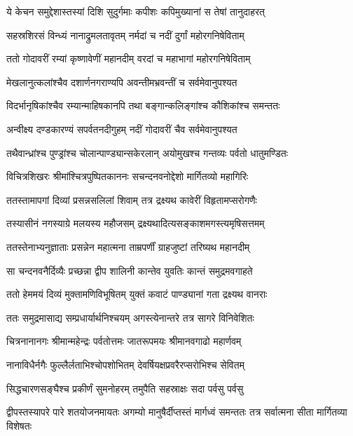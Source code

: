 \twolineshloka
{ये केचन समुद्देशास्तस्यां दिशि सुदुर्गमाः}
{कपीशः कपिमुख्यानां स तेषां तानुदाहरत्} %

\twolineshloka
{सहस्रशिरसं विन्ध्यं नानाद्रुमलतावृतम्}
{नर्मदां च नदीं दुर्गां महोरगनिषेविताम्} %

\twolineshloka
{ततो गोदावरीं रम्यां कृष्णावेणीं महानदीम्}
{वरदां च महाभागां महोरगनिषेविताम्} %

\twolineshloka
{मेखलानुत्कलांश्चैव दशार्णनगराण्यपि}
{अवन्तीमभ्रवन्तीं च सर्वमेवानुपश्यत} %

\twolineshloka
{विदर्भानृषिकांश्चैव रम्यान्माहिषकानपि}
{तथा बङ्गान्कलिङ्गांश्च कौशिकांश्च समन्ततः} %

\twolineshloka
{अन्वीक्ष्य दण्डकारण्यं सपर्वतनदीगुहम्}
{नदीं गोदावरीं चैव सर्वमेवानुपश्यत} %

\twolineshloka
{तथैवान्ध्रांश्च पुण्ड्रांश्च चोलान्पाण्ड्यान्सकेरलान्}
{अयोमुखश्च गन्तव्यः पर्वतो धातुमण्डितः} %

\twolineshloka
{विचित्रशिखरः श्रीमांश्चित्रपुष्पितकाननः}
{सचन्दनवनोद्देशो मार्गितव्यो महागिरिः} %

\twolineshloka
{ततस्तामापगां दिव्यां प्रसन्नसलिलां शिवाम्}
{तत्र द्रक्ष्यथ कावेरीं विहृतामप्सरोगणैः} %

\twolineshloka
{तस्यासीनं नगस्याग्रे मलयस्य महौजसम्}
{द्रक्ष्यथादित्यसङ्काशमगस्त्यमृषिसत्तमम्} %

\twolineshloka
{ततस्तेनाभ्यनुज्ञाताः प्रसन्नेन महात्मना}
{ताम्रपर्णीं ग्राहजुष्टां तरिष्यथ महानदीम्} %

\twolineshloka
{सा चन्दनवनैर्दिव्यैः प्रच्छन्ना द्वीप शालिनी}
{कान्तेव युवतिः कान्तं समुद्रमवगाहते} %

\twolineshloka
{ततो हेममयं दिव्यं मुक्तामणिविभूषितम्}
{युक्तं कवाटं पाण्ड्यानां गता द्रक्ष्यथ वानराः} %

\twolineshloka
{ततः समुद्रमासाद्य सम्प्रधार्यार्थनिश्चयम्}
{अगस्त्येनान्तरे तत्र सागरे विनिवेशितः} %

\twolineshloka
{चित्रनानानगः श्रीमान्महेन्द्रः पर्वतोत्तमः}
{जातरूपमयः श्रीमानवगाढो महार्णवम्} %

\twolineshloka
{नानाविधैर्नगैः फुल्लैर्लताभिश्चोपशोभितम्}
{देवर्षियक्षप्रवरैरप्सरोभिश्च सेवितम्} %

\twolineshloka
{सिद्धचारणसङ्घैश्च प्रकीर्णं सुमनोहरम्}
{तमुपैति सहस्राक्षः सदा पर्वसु पर्वसु} %

\threelineshloka
{द्वीपस्तस्यापरे पारे शतयोजनमायतः}
{अगम्यो मानुषैर्दीप्तस्तं मार्गध्वं समन्ततः}
{तत्र सर्वात्मना सीता मार्गितव्या विशेषतः} %

